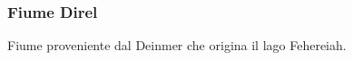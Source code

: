 \subsubsection{Fiume Direl}\label{loc:direl}
Fiume proveniente dal Deinmer che origina il lago Fehereiah.
